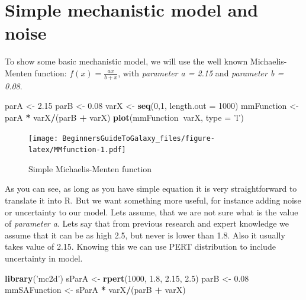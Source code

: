 \documentclass[]{book}
\newenvironment{Shaded}{\begin{snugshade}}{\end{snugshade}}
\newcommand{\KeywordTok}[1]{\textcolor[rgb]{0.13,0.29,0.53}{\textbf{#1}}}
\newcommand{\DataTypeTok}[1]{\textcolor[rgb]{0.13,0.29,0.53}{#1}}
\newcommand{\DecValTok}[1]{\textcolor[rgb]{0.00,0.00,0.81}{#1}}
\newcommand{\FloatTok}[1]{\textcolor[rgb]{0.00,0.00,0.81}{#1}}
\newcommand{\StringTok}[1]{\textcolor[rgb]{0.31,0.60,0.02}{#1}}
\newcommand{\OperatorTok}[1]{\textcolor[rgb]{0.81,0.36,0.00}{\textbf{#1}}}
\newcommand{\NormalTok}[1]{#1}
\theoremstyle{definition}
\theoremstyle{definition}
\theoremstyle{definition}
\theoremstyle{remark}
\begin{document}
\section{Simple mechanistic model and
noise}\label{simple-mechanistic-model-and-noise}

To show some basic mechanistic model, we will use the well known
Michaelis-Menten function: \(f(x) = \frac{ax}{b+x}\), with
\emph{parameter a = 2.15} and \emph{parameter b = 0.08}.

\begin{Shaded}
\begin{Highlighting}[]
\NormalTok{parA <-}\StringTok{ }\FloatTok{2.15}
\NormalTok{parB <-}\StringTok{ }\FloatTok{0.08}
\NormalTok{varX <-}\StringTok{ }\KeywordTok{seq}\NormalTok{(}\DecValTok{0}\NormalTok{,}\DecValTok{1}\NormalTok{, }\DataTypeTok{length.out =} \DecValTok{1000}\NormalTok{)}
\NormalTok{mmFunction <-}\StringTok{ }\NormalTok{parA }\OperatorTok{*}\StringTok{ }\NormalTok{varX}\OperatorTok{/}\NormalTok{(parB }\OperatorTok{+}\StringTok{ }\NormalTok{varX)}
\KeywordTok{plot}\NormalTok{(mmFunction}\OperatorTok{~}\NormalTok{varX, }\DataTypeTok{type =} \StringTok{'l'}\NormalTok{)}
\end{Highlighting}
\end{Shaded}

\begin{figure}
\centering
\texttt{[image: BeginnersGuideToGalaxy\_files/figure-latex/MMfunction-1.pdf]}
\caption{\label{fig:MMfunction}Simple Michaelis-Menten function}
\end{figure}

As you can see, as long as you have simple equation it is very
straightforward to translate it into R. But we want something more
useful, for instance adding noise or uncertainty to our model. Lets
assume, that we are not sure what is the value of \emph{parameter a}.
Lets say that from previous research and expert knowledge we assume that
it can be as high 2.5, but never is lower than 1.8. Also it usually
takes value of 2.15. Knowing this we can use PERT distribution to
include uncertainty in model.

\begin{Shaded}
\begin{Highlighting}[]
\KeywordTok{library}\NormalTok{(}\StringTok{'mc2d'}\NormalTok{)}
\NormalTok{sParA <-}\StringTok{ }\KeywordTok{rpert}\NormalTok{(}\DecValTok{1000}\NormalTok{, }\FloatTok{1.8}\NormalTok{, }\FloatTok{2.15}\NormalTok{, }\FloatTok{2.5}\NormalTok{)}
\NormalTok{parB <-}\StringTok{ }\FloatTok{0.08}
\NormalTok{mmSAFunction <-}\StringTok{ }\NormalTok{sParA }\OperatorTok{*}\StringTok{ }\NormalTok{varX}\OperatorTok{/}\NormalTok{(parB }\OperatorTok{+}\StringTok{ }\NormalTok{varX)}
\end{Highlighting}
\end{Shaded}
\end{document}
